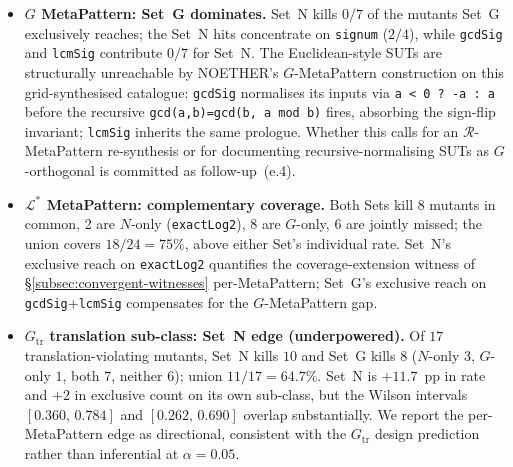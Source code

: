 \documentclass[acmsmall,screen,review]{acmart}
\begin{document}
\begin{itemize}[nosep,leftmargin=*]
\item \textbf{$G$ MetaPattern: Set~G dominates.} Set~N kills $0/7$ of the mutants Set~G exclusively reaches; the Set~N hits concentrate on \texttt{signum} ($2/4$), while \texttt{gcdSig} and \texttt{lcmSig} contribute $0/7$ for Set~N. The Euclidean-style SUTs are structurally unreachable by NOETHER's $G$-MetaPattern construction on this grid-synthesised catalogue: \texttt{gcdSig} normalises its inputs via \texttt{a < 0 ? -a : a} before the recursive \texttt{gcd(a,b)=gcd(b, a\,mod\,b)} fires, absorbing the sign-flip invariant; \texttt{lcmSig} inherits the same prologue. Whether this calls for an $\mathcal{R}$-MetaPattern re-synthesis or for documenting recursive-normalising SUTs as $G$-orthogonal is committed as follow-up~(e.4).

\item \textbf{$\mathcal{L}^{*}$ MetaPattern: complementary coverage.} Both Sets kill 8 mutants in common, 2 are $N$-only (\texttt{exactLog2}), 8 are $G$-only, 6 are jointly missed; the union covers $18/24 = 75\%$, above either Set's individual rate. Set~N's exclusive reach on \texttt{exactLog2} quantifies the coverage-extension witness of \S\ref{subsec:convergent-witnesses} per-MetaPattern; Set~G's exclusive reach on \texttt{gcdSig}+\texttt{lcmSig} compensates for the $G$-MetaPattern gap.

\item \textbf{$G_{\mathrm{tr}}$ translation sub-class: Set~N edge (underpowered).} Of $17$ translation-violating mutants, Set~N kills $10$ and Set~G kills $8$ ($N$-only $3$, $G$-only $1$, both $7$, neither $6$); union $11/17 = 64.7\%$. Set~N is $+11.7$~pp in rate and $+2$ in exclusive count on its own sub-class, but the Wilson intervals $[0.360,\,0.784]$ and $[0.262,\,0.690]$ overlap substantially. We report the per-MetaPattern edge as directional, consistent with the $G_{\mathrm{tr}}$ design prediction rather than inferential at $\alpha = 0.05$.
\end{itemize}
\end{document}
